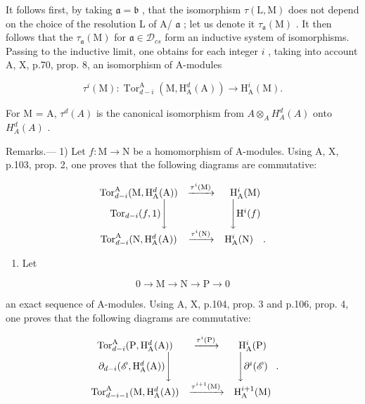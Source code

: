 It follows first, by taking \(\mathfrak{a} = \mathfrak{b}\) , that the isomorphism \(\tau(\mathrm{L},\mathrm{M})\) does not depend on the choice of the resolution L of A/ \(\mathfrak{a}\) ; let us denote it \(\tau_{\mathfrak{a}}(\mathrm{M})\) . It then follows that the \(\tau_{\mathfrak{a}}(\mathrm{M})\) for \(\mathfrak{a} \in \mathcal{D}_{cs}\) form an inductive system of isomorphisms. Passing to the inductive limit, one obtains for each integer \(i\) , taking into account A, X, p.70, prop. 8, an isomorphism of A-modules

\[
\tau^ {i} (\mathrm{M}): \operatorname{Tor} _ {d - i} ^ {\mathrm{A}} (\mathrm{M}, \mathrm{H} _ {\mathrm{A}} ^ {d} (\mathrm{A})) \longrightarrow \mathrm{H} _ {\mathrm{A}} ^ {i} (\mathrm{M}).
\]

For M = A, \(\tau^{d}(A)\) is the canonical isomorphism from \(A \otimes_{A} H_{A}^{d}(A)\) onto \(H_{A}^{d}(A)\) .

Remarks.--- 1) Let \(f: \mathrm{M} \to \mathrm{N}\) be a homomorphism of A-modules. Using A, X, p.103, prop. 2, one proves that the following diagrams are commutative:

\[
\begin{array}{c c c} \operatorname{Tor} _ {d - i} ^ {\mathrm{A}} (\mathrm{M}, \mathrm{H} _ {\mathrm{A}} ^ {d} (\mathrm{A})) & \xrightarrow {\tau^ {i} (\mathrm{M})} & \mathrm{H} _ {\mathrm{A}} ^ {i} (\mathrm{M}) \\ \operatorname{Tor} _ {d - i} (f, 1) \Bigg \downarrow & & \Bigg \downarrow \mathrm{H} ^ {i} (f) \\ \operatorname{Tor} _ {d - i} ^ {\mathrm{A}} (\mathrm{N}, \mathrm{H} _ {\mathrm{A}} ^ {d} (\mathrm{A})) & \xrightarrow {\tau^ {i} (\mathrm{N})} & \mathrm{H} _ {\mathrm{A}} ^ {i} (\mathrm{N}) \quad . \end{array}
\]

\begin{enumerate}
\def\labelenumi{\arabic{enumi})}
\setcounter{enumi}{1}
\tightlist
\item
  Let
\end{enumerate}

\[
0 \to \mathrm{M} \to \mathrm{N} \to \mathrm{P} \to 0\tag{ℰ}
\]

an exact sequence of A-modules. Using A, X, p.104, prop. 3 and p.106, prop. 4, one proves that the following diagrams are commutative:

\[
\begin{array}{c c c} \operatorname{Tor} _ {d - i} ^ {\mathrm{A}} (\mathrm{P}, \mathrm{H} _ {\mathrm{A}} ^ {d} (\mathrm{A})) & \xrightarrow {\tau^ {i} (\mathrm{P})} & \mathrm{H} _ {\mathrm{A}} ^ {i} (\mathrm{P}) \\ \partial_ {d - i} (\mathscr {E}, \mathrm{H} _ {\mathrm{A}} ^ {d} (\mathrm{A})) \Bigg \downarrow & & \Bigg \downarrow \partial^ {i} (\mathscr {E}) \\ \operatorname{Tor} _ {d - i - 1} ^ {\mathrm{A}} (\mathrm{M}, \mathrm{H} _ {\mathrm{A}} ^ {d} (\mathrm{A})) & \xrightarrow {\tau^ {i + 1} (\mathrm{M})} & \mathrm{H} _ {\mathrm{A}} ^ {i + 1} (\mathrm{M}) \end{array} .
\]


